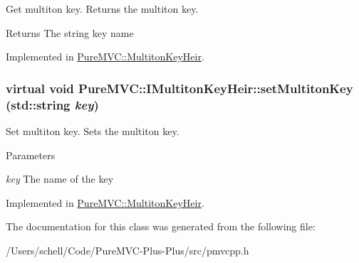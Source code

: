 Get multiton key. Returns the multiton key. \begin{DoxyReturn}{Returns}
The string key name 
\end{DoxyReturn}


Implemented in \hyperlink{class_pure_m_v_c_1_1_multiton_key_heir_aa5622459d33380deb08dc3cab8b991c7}{PureMVC::MultitonKeyHeir}.\hypertarget{class_pure_m_v_c_1_1_i_multiton_key_heir_a03acb75ab79defba2c28b8de1bbe1ca6}{
\subsubsection[{setMultitonKey}]{\setlength{\rightskip}{0pt plus 5cm}virtual void PureMVC::IMultitonKeyHeir::setMultitonKey (std::string {\em key})}}
\label{class_pure_m_v_c_1_1_i_multiton_key_heir_a03acb75ab79defba2c28b8de1bbe1ca6}


Set multiton key. Sets the multiton key. 
\begin{DoxyParams}{Parameters}
\item[{\em key}]The name of the key \end{DoxyParams}


Implemented in \hyperlink{class_pure_m_v_c_1_1_multiton_key_heir_abc70ef7c066bc8d7bf0196ec727599bb}{PureMVC::MultitonKeyHeir}.

The documentation for this class was generated from the following file:\begin{DoxyCompactItemize}
\item 
/Users/schell/Code/PureMVC-\/Plus-\/Plus/src/pmvcpp.h\end{DoxyCompactItemize}
